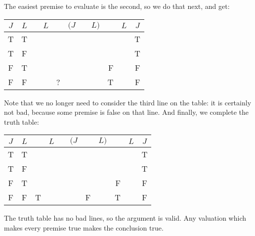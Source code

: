 The easiest premise to evaluate is the second, so we do that next, and get:
\begin{center}
	\begin{tabular}{c c|d e e e e f |d f|c}
		$J$&$L$&\enot&$L$&\eif&$(J$&\eor&$L)$&\enot&$L$&$J$\\
		\hline
		T & T & &&&&&&&& {T}\\
		T & F & &&&&&&&& {T}\\
		F & T & &&&&&&{F}&& {F}\\
		F & F & &&?&&&&{T}&& {F}
	\end{tabular}
\end{center}
Note that we no longer need to consider the third line on the table: it is certainly not bad, because some premise is false on that line. And finally, we complete the truth table:
\begin{center}
	\begin{tabular}{c c|d e e e e f |d f|c}
		$J$&$L$&\enot&$L$&\eif&$(J$&\eor&$L)$&\enot&$L$&$J$\\
		\hline
		T & T & &&&&&&&& {T}\\
		T & F & &&&&&&&& {T}\\
		F & T & &&&&&&{F}& & {F}\\
		F & F & T &  &  &  & F & & {T} & & {F}
	\end{tabular}
\end{center}
The truth table has no bad lines, so the argument is valid. Any valuation which makes every premise true makes the conclusion true.

